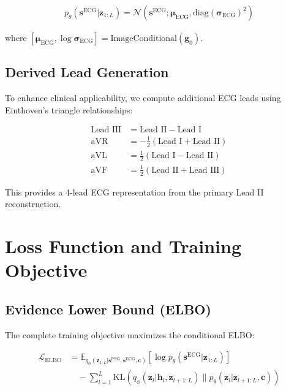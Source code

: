\documentclass[11pt]{article}
\begin{document}
\begin{align}
p_\theta(\mathbf{s}^{\text{ECG}} | \mathbf{z}_{1:L}) = \mathcal{N}(\mathbf{s}^{\text{ECG}}; \boldsymbol{\mu}_{\text{ECG}}, \text{diag}(\boldsymbol{\sigma}_{\text{ECG}})^2)
\end{align}

where $[\boldsymbol{\mu}_{\text{ECG}}, \log \boldsymbol{\sigma}_{\text{ECG}}] = \text{ImageConditional}(\mathbf{g}_0)$.

\subsection{Derived Lead Generation}

To enhance clinical applicability, we compute additional ECG leads using Einthoven's triangle relationships:

\begin{align}
\text{Lead III} &= \text{Lead II} - \text{Lead I} \\
\text{aVR} &= -\frac{1}{2}(\text{Lead I} + \text{Lead II}) \\
\text{aVL} &= \frac{1}{2}(\text{Lead I} - \text{Lead II}) \\
\text{aVF} &= \frac{1}{2}(\text{Lead II} + \text{Lead III})
\end{align}

This provides a 4-lead ECG representation from the primary Lead II reconstruction.

\section{Loss Function and Training Objective}

\subsection{Evidence Lower Bound (ELBO)}

The complete training objective maximizes the conditional ELBO:

\begin{align}
\mathcal{L}_{\text{ELBO}} &= \mathbb{E}_{q_\phi(\mathbf{z}_{1:L} | \mathbf{s}^{\text{PSG}}, \mathbf{s}^{\text{ECG}}, \mathbf{c})} \left[ \log p_\theta(\mathbf{s}^{\text{ECG}} | \mathbf{z}_{1:L}) \right] \\
&\quad - \sum_{l=1}^{L} \text{KL}\left( q_\phi(\mathbf{z}_l | \mathbf{h}_l, \mathbf{z}_{l+1:L}) \| p_\theta(\mathbf{z}_l | \mathbf{z}_{l+1:L}, \mathbf{c}) \right)
\end{align}
\end{document}
